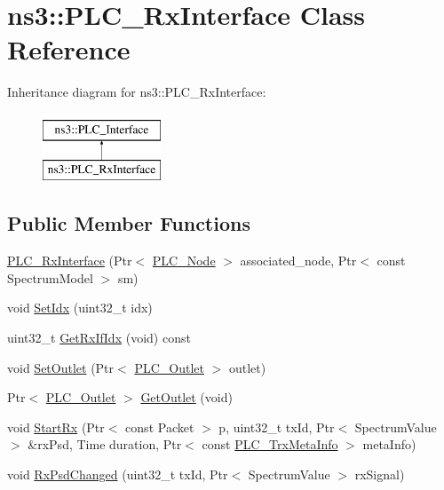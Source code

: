 \hypertarget{classns3_1_1PLC__RxInterface}{\section{ns3\-:\-:\-P\-L\-C\-\_\-\-Rx\-Interface \-Class \-Reference}
\label{classns3_1_1PLC__RxInterface}
}
\-Inheritance diagram for ns3\-:\-:\-P\-L\-C\-\_\-\-Rx\-Interface\-:\begin{figure}[H]
\begin{center}
\leavevmode
\includegraphics[height=2.000000cm]{classns3_1_1PLC__RxInterface}
\end{center}
\end{figure}
\subsection*{\-Public \-Member \-Functions}
\begin{DoxyCompactItemize}
\item 
\hyperlink{classns3_1_1PLC__RxInterface_aaa0968f79a07db808c0122c28ec25204}{\-P\-L\-C\-\_\-\-Rx\-Interface} (\-Ptr$<$ \hyperlink{classns3_1_1PLC__Node}{\-P\-L\-C\-\_\-\-Node} $>$ associated\-\_\-node, \-Ptr$<$ const \-Spectrum\-Model $>$ sm)
\item 
void \hyperlink{classns3_1_1PLC__RxInterface_a2760adb4b1bda24377254c7fec9cd21d}{\-Set\-Idx} (uint32\-\_\-t idx)
\item 
uint32\-\_\-t \hyperlink{classns3_1_1PLC__RxInterface_aa0c5595df05fa4bdfe66e7ddb24059fc}{\-Get\-Rx\-If\-Idx} (void) const 
\item 
void \hyperlink{classns3_1_1PLC__RxInterface_ad7659f89d745e25b469beb2dfcc475d1}{\-Set\-Outlet} (\-Ptr$<$ \hyperlink{classns3_1_1PLC__Outlet}{\-P\-L\-C\-\_\-\-Outlet} $>$ outlet)
\item 
\-Ptr$<$ \hyperlink{classns3_1_1PLC__Outlet}{\-P\-L\-C\-\_\-\-Outlet} $>$ \hyperlink{classns3_1_1PLC__RxInterface_a51921ebe8b6889afe7df65329a272d47}{\-Get\-Outlet} (void)
\item 
void \hyperlink{classns3_1_1PLC__RxInterface_a8dfc9936531323a25d3625d0e9a2a707}{\-Start\-Rx} (\-Ptr$<$ const \-Packet $>$ p, uint32\-\_\-t tx\-Id, \-Ptr$<$ \-Spectrum\-Value $>$ \&rx\-Psd, \-Time duration, \-Ptr$<$ const \hyperlink{classns3_1_1PLC__TrxMetaInfo}{\-P\-L\-C\-\_\-\-Trx\-Meta\-Info} $>$ meta\-Info)
\item 
void \hyperlink{classns3_1_1PLC__RxInterface_a5ed074ad9563a148975b3b5b3e15eb40}{\-Rx\-Psd\-Changed} (uint32\-\_\-t tx\-Id, \-Ptr$<$ \-Spectrum\-Value $>$ rx\-Signal)
\end{DoxyCompactItemize}
